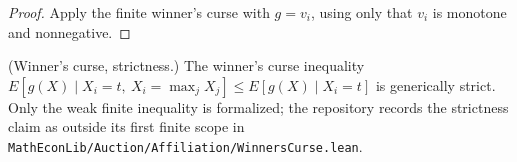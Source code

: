 \begin{proof}
\leanok
{}
Apply the finite winner's curse with $g = v_i$, using only that $v_i$ is monotone and nonnegative.
\end{proof}

\begin{theorem}\label{thm:open.winners_curse_strict}
(Winner's curse, strictness.) The winner's curse inequality $E[g(X) \mid X_i = t,\ X_i = \max_j X_j] \le E[g(X) \mid X_i = t]$ is generically strict. Only the weak finite inequality is formalized; the repository records the strictness claim as outside its first finite scope in \texttt{MathEconLib/Auction/Affiliation/WinnersCurse.lean}.
\end{theorem}
